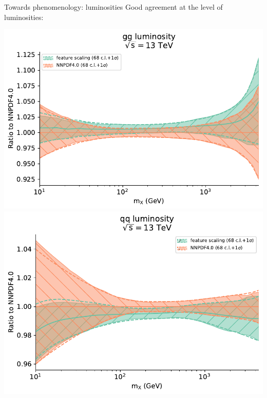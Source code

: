 \documentclass[aspectratio=169,11pt]{beamer}
\begin{document}
\begin{frame}[t]{Towards phenomenology: luminosities}
  Good agreement at the level of luminosities:
  \begin{center}
    \includegraphics[height=0.5\textheight]{figures/1dlumi_gg_feature_vs_nnpdf40.pdf}
    \includegraphics[height=0.5\textheight]{figures/1dlumi_qq_feature_vs_nnpdf40.pdf}
  \end{center}
\end{frame}
\end{document}

